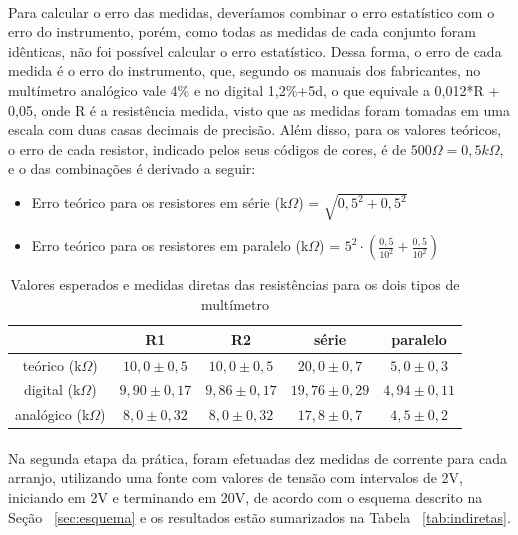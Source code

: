 \documentclass[11pt,a4paper]{article}
\begin{document}
      \paragraph{}
      Para calcular o erro das medidas, deveríamos combinar o erro estatístico com o erro do instrumento, porém, como todas as medidas de cada conjunto foram idênticas, não foi possível calcular o erro estatístico. Dessa forma, o erro de cada medida é o erro do instrumento, que, segundo os manuais dos fabricantes, no multímetro analógico vale 4\% e no digital 1,2\%+5d, o que equivale a 0,012*R + 0,05, onde R é a resistência medida, visto que as medidas foram tomadas em uma escala com duas casas decimais de precisão.
      Além disso, para os valores teóricos, o erro de cada resistor, indicado pelos seus códigos de cores, é de $500\Omega = 0,5k\Omega$, e o das combinações é derivado a seguir:
      \begin{itemize}
        \item Erro teórico para os resistores em série (k$\Omega$) = $\sqrt{0,5^{2} + 0,5^{2}}$
        \item Erro teórico para os resistores em paralelo (k$\Omega$) = $5^{2}\cdot(\frac{0,5}{10^{2}}+ \frac{0,5}{10^{2}})$
      \end{itemize} 
         
      \begin{table}[htb!]
        \centering 
        \begin{tabular}{c|cccc}
          \toprule
                               &  R1            &  R2             & série          & paralelo      \\
          \midrule
          teórico (k$\Omega$)  & $10,0\pm0,5 $  & $10,0 \pm 0,5$  & $20,0\pm0,7$   & $5,0\pm0,3$   \\   
          digital (k$\Omega$)  & $9,90\pm 0,17$ & $9,86 \pm 0,17$ & $19,76\pm0,29$ & $4,94\pm0,11$ \\
          analógico (k$\Omega$)& $8,0\pm0,32$   & $8,0\pm0,32$    & $17,8\pm0,7$   & $4,5\pm0,2$   \\
          \bottomrule
        \end{tabular}
        \caption{Valores esperados e medidas diretas das resistências para os dois tipos de multímetro}
        \label{tab:diretas}
      \end{table}
        
      \paragraph{}
      Na segunda etapa da prática, foram efetuadas dez medidas de corrente para cada arranjo, utilizando uma fonte com valores de tensão com intervalos de 2V, iniciando em 2V e terminando em 20V, de acordo com o esquema descrito na Seção ~\ref{sec:esquema} e os resultados estão sumarizados na Tabela ~\ref{tab:indiretas}.
\end{document}
